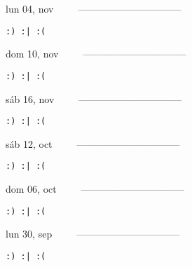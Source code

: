 \documentclass[letterpaper,10pt]{article}
\begin{document}
\begin{multicols}{3}
{lun 04, nov\ \ \ \ \ --------------------------------}
\begin{flushright}\begin{small}\texttt{:) :| :(}\end{small}\end{flushright}
\vfill
{dom 10, nov\ \ \ \ \ --------------------------------}
\begin{flushright}\begin{small}\texttt{:) :| :(}\end{small}\end{flushright}\par
\vfill
{sáb 16, nov\ \ \ \ \ --------------------------------}
\begin{flushright}\begin{small}\texttt{:) :| :(}\end{small}\end{flushright}\par
\vfill
\end{multicols}
\vspace{1.05cm}

\begin{multicols}{3}
{sáb 12, oct\ \ \ \ \ --------------------------------}
\begin{flushright}\begin{small}\texttt{:) :| :(}\end{small}\end{flushright}
\vfill
{dom 06, oct\ \ \ \ \ --------------------------------}
\begin{flushright}\begin{small}\texttt{:) :| :(}\end{small}\end{flushright}\par
\vfill
{lun 30, sep\ \ \ \ \ --------------------------------}
\begin{flushright}\begin{small}\texttt{:) :| :(}\end{small}\end{flushright}\par
\vfill
\end{multicols}
\vspace{1.05cm}
\end{document}
